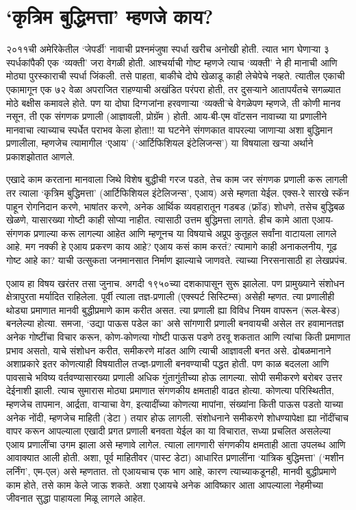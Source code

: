 \chapter{`कृत्रिम बुद्धिमत्ता' म्हणजे काय?}

२०११ची अमेरिकेतील `जेपर्डी' नावाची प्रश्नमंजुषा स्पर्धा खरीच अनोखी होती. त्यात भाग घेणाऱ्या ३ स्पर्धकांपैकी एक `व्यक्ती' जरा वेगळी होती. आश्चर्याची गोष्ट म्हणजे त्याच  `व्यक्ती' ने ही मानाची आणि मोठ्या पुरस्काराची स्पर्धा जिंकली. तसे पाहता, बाकीचे दोघे खेळाडू काही लेचेपेचे नव्हते. त्यातील एकाची एकामागून एक ७२ वेळा अपराजित राहण्याची अखंडित परंपरा होती, तर दुसऱ्याने आतापर्यंतचे सगळ्यात मोठे बक्षीस कमावले होते. पण या दोघा दिग्गजांना हरवणाऱ्या `व्यक्ती'चे वेगळेपण म्हणजे, ती कोणी मानव नसून, ती एक संगणक प्रणाली (आज्ञावली, प्रोग्रॅम ) होती. आय-बी-एम वॉटसन   नावाच्या या प्रणालीने मानवाचा त्याच्याच स्पर्धेत पराभव केला होता!! या घटनेने संगणकात वापरल्या जाणाऱ्या अशा बुद्धिमान प्रणालीला, म्हणजेच त्यामागील `एआय' (`आर्टिफिशियल इंटेलिजन्स') या विषयाला खऱ्या अर्थाने प्रकाशझोतात आणले.

एखादे काम करताना मानवाला जिथे विशेष बुद्धीची गरज पडते, तेच काम जर संगणक प्रणाली करू लागली तर त्याला `कृत्रिम बुद्धिमत्ता' (आर्टिफिशियल इंटेलिजन्स', एआय) असे म्हणता येईल. एक्स-रे सारखे स्कॅन पाहून रोगनिदान करणे, भाषांतर करणे, अनेक आर्थिक व्यवहारातून गडबड (फ्रॉड) शोधणे, तसेच बुद्धिबळ खेळणे, यासारख्या गोष्टी काही सोप्या नाहीत. त्यासाठी उत्तम बुद्धिमत्ता लागते. हीच कामे आता एआय-संगणक प्रणाल्या करू लागल्या आहेत आणि म्हणूनच या विषयाचे अप्रूप कुतूहल सर्वांना वाटायला लागले आहे. मग नक्की हे एआय प्रकरण काय आहे? एआय कसं काम करतं? त्यामागे काही अनाकलनीय, गूढ गोष्ट आहे का? याची उत्सुकता जनमानसात निर्माण झाल्याचे जाणवते. त्याच्या निरसनासाठी हा लेखप्रपंच.

एआय हा विषय खरंतर तसा जुनाच. अगदी १९५०च्या दशकापासून सुरू झालेला. पण प्रामुख्याने संशोधन क्षेत्रापुरता मर्यादित राहिलेला. पूर्वी त्याला तज्ञ-प्रणाली (एक्स्पर्ट सिस्टिम्स) असेही म्हणत. त्या प्रणालीही थोड्या प्रमाणात मानवी बुद्धीप्रमाणे काम करीत असत. त्या प्रणाली ह्या विविध नियम वापरून (रूल-बेस्ड) बनलेल्या होत्या. समजा, `उद्या पाऊस पडेल का' असे सांगणारी प्रणाली बनवायची असेल तर हवामानतज्ञ अनेक गोष्टींचा विचार करून, कोण-कोणत्या गोष्टी पाऊस पडणे ठरवू शकतात आणि त्यांचा किती प्रमाणात प्रभाव असतो, याचे संशोधन करीत, समीकरणे मांडत आणि त्याची आज्ञावली बनत असे. ढोबळमानाने अशाप्रकारे इतर कोणत्याही विषयातील तज्ज्ञ-प्रणाली बनवण्याची पद्धत होती. पण काळ बदलला आणि पावसाचे भविष्य वर्तवण्यासारख्या प्रणाली अधिक गुंतागुंतीच्या होऊ लागल्या. सोपी समीकरणे बरोबर उत्तर देईनाशी झाली. त्याच सुमारास मोठ्या प्रमाणात संगणकीय क्षमताही वाढत होत्या. कोणत्या परिस्थितीत, म्हणजेच तापमान, आर्द्रता, वाऱ्याचा वेग, इत्यादींच्या कोणत्या मापांना, संख्यांना किती पाऊस पडतो याच्या अनेक नोंदी, म्हणजेच माहिती (डेटा ) तयार होऊ लागली. संशोधनाने समीकरणे शोधण्यापेक्षा ह्या नोंदींचाच वापर करून आपल्याला एखादी प्रगत प्रणाली बनवता येईल का या विचारात, सध्या प्रचलित असलेल्या एआय प्रणालींचा उगम झाला असे म्हणावे लागेल. त्याला लागणारी संगणकीय क्षमताही आता उपलब्ध आणि आवाक्यात आली होती. अशा, पूर्व माहितीवर (पास्ट डेटा) आधारित प्रणालींना `यांत्रिक बुद्धिमत्ता' (`मशीन लर्निंग', एम-एल) असे म्हणतात. तो एआयचाच एक भाग आहे, कारण त्याच्याकडूनही, मानवी बुद्धीप्रमाणे काम होते, तसे काम केले जाऊ शकते. अशा एआयचे अनेक आविष्कार आता आपल्याला नेहमीच्या जीवनात सुद्धा पाहायला मिळू लागले आहेत.


